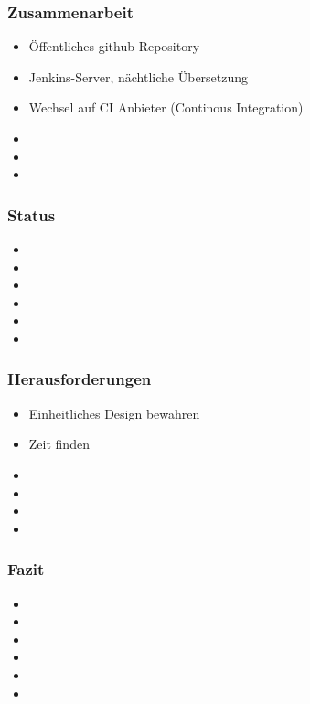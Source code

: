 \documentclass[12pt,ngerman]{beamer}
\begin{document}
\begin{frame}
\frametitle{Zusammenarbeit}


\begin{itemize}
\item Öffentliches github-Repository
\item Jenkins-Server, nächtliche Übersetzung
\item Wechsel auf CI Anbieter (Continous Integration)
\item 
\item 
\item 
\end{itemize}
\end{frame}
 
 
\begin{frame}
\frametitle{Status}

\begin{itemize}
\item 
\item 
\item 
\item 
\item 
\item 
\end{itemize}
\end{frame}

\begin{frame}
\frametitle{Herausforderungen}


\begin{itemize}
\item Einheitliches Design bewahren
\item Zeit finden
\item 
\item 
\item 
\item 
\end{itemize}
\end{frame}


\begin{frame}
\frametitle{Fazit}


\begin{itemize}
\item 
\item 
\item 
\item 
\item 
\item 
\end{itemize}
\end{frame} 
 
\end{document}
